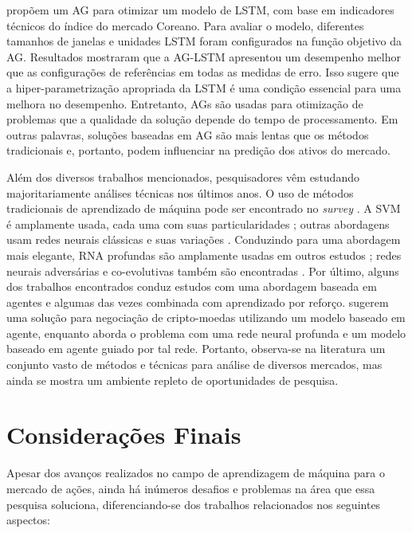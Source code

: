 \textcite{ga_optimized_lstm} propõem um \acrfull{AG} para otimizar um modelo de LSTM, com base em indicadores técnicos do índice do mercado Coreano. Para avaliar o modelo, diferentes tamanhos de janelas e unidades LSTM foram configurados na função objetivo da \acrshort{AG}. Resultados mostraram que a AG-LSTM apresentou um desempenho melhor que as configurações de referências em todas as medidas de erro. Isso sugere que a hiper-parametrização apropriada da LSTM é uma condição essencial para uma melhora no desempenho. Entretanto, \acrshort{AG}s são usadas para otimização de problemas que a qualidade da solução depende do tempo de processamento. Em outras palavras, soluções baseadas em \acrshort{AG} são mais lentas que os métodos tradicionais e, portanto, podem influenciar na predição dos ativos do mercado.

Além dos diversos trabalhos mencionados, pesquisadores vêm estudando majoritariamente análises técnicas nos últimos anos. O uso de métodos tradicionais de aprendizado de máquina pode ser encontrado no \textit{survey} \cite{review}. A \acrshort{SVM} é amplamente usada, cada uma com suas particularidades \cite{predicting_direction_svm,  hybrid_forecasting, gabased_svm, clustering_svm}; outras abordagens usam redes neurais clássicas e suas variações \cite{forecasting_returns, nn_forecasting}. Conduzindo para uma abordagem mais elegante, \acrshort{RNA} profundas são amplamente usadas em outros estudos \cite{method_rep_studies, increase_decrease, classification_dnn, candlestick}; redes neurais adversárias e co-evolutivas também são encontradas \cite{adversarial_portifolio, convolutional_image}. Por último, alguns dos trabalhos encontrados conduz estudos com uma abordagem baseada em agentes e algumas das vezes combinada com aprendizado por reforço. \textcite{cryptocurrency} sugerem uma solução para negociação de cripto-moedas utilizando um modelo baseado em agente, enquanto \textcite{ftgame} aborda o problema com uma rede neural profunda e um modelo baseado em agente guiado por tal rede. Portanto, observa-se na literatura um conjunto vasto de métodos e técnicas para análise de diversos mercados, mas ainda se mostra um ambiente repleto de oportunidades de pesquisa.

\section{Considerações Finais}

Apesar dos avanços realizados no campo de aprendizagem de máquina para o mercado de ações, ainda há inúmeros desafios e problemas na área que essa pesquisa soluciona, diferenciando-se dos trabalhos relacionados nos seguintes aspectos:

